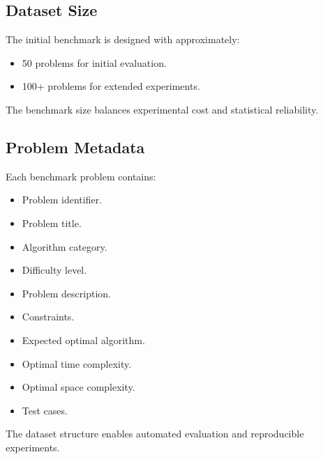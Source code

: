 \subsection{Dataset Size}

The initial benchmark is designed with approximately:

\begin{itemize}

\item 50 problems for initial evaluation.

\item 100+ problems for extended experiments.

\end{itemize}


The benchmark size balances experimental cost and statistical reliability.


\subsection{Problem Metadata}

Each benchmark problem contains:

\begin{itemize}

\item Problem identifier.

\item Problem title.

\item Algorithm category.

\item Difficulty level.

\item Problem description.

\item Constraints.

\item Expected optimal algorithm.

\item Optimal time complexity.

\item Optimal space complexity.

\item Test cases.

\end{itemize}


The dataset structure enables automated evaluation and reproducible
experiments.
